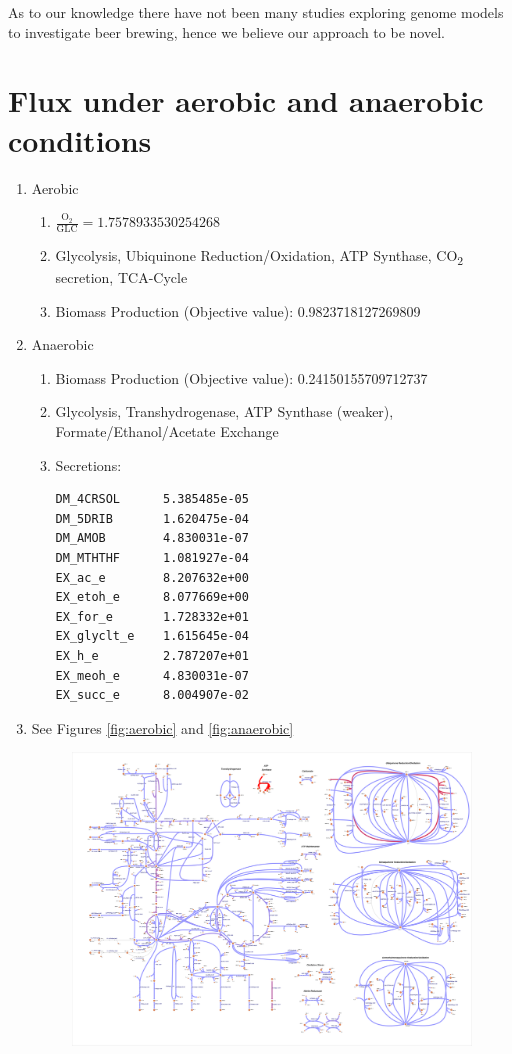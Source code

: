 \documentclass{scrartcl}
\begin{document}
As to our knowledge there have not been many studies exploring genome models to investigate beer brewing, hence we believe our approach to be novel.

\printbibliography
\section{Flux under aerobic and anaerobic conditions}
\begin{enumerate}
\item Aerobic
\begin{enumerate}
\item $\mathrm{\frac{O_2}{GLC}} = 1.7578933530254268$
\item Glycolysis, Ubiquinone Reduction/Oxidation, ATP Synthase, CO\textsubscript{2} secretion, TCA-Cycle
\item Biomass Production (Objective value): 0.9823718127269809
\end{enumerate}
\item Anaerobic
\begin{enumerate}
\item Biomass Production (Objective value): 0.24150155709712737
\item Glycolysis, Transhydrogenase, ATP Synthase (weaker), Formate/Ethanol/Acetate Exchange
\item Secretions: 
\begin{lstlisting}
DM_4CRSOL      5.385485e-05
DM_5DRIB       1.620475e-04
DM_AMOB        4.830031e-07
DM_MTHTHF      1.081927e-04
EX_ac_e        8.207632e+00
EX_etoh_e      8.077669e+00
EX_for_e       1.728332e+01
EX_glyclt_e    1.615645e-04
EX_h_e         2.787207e+01
EX_meoh_e      4.830031e-07
EX_succ_e      8.004907e-02
\end{lstlisting}
\end{enumerate}
\item See Figures \ref{fig:aerobic} and \ref{fig:anaerobic}
\begin{figure}[H]
	\centering
	\includegraphics[max width=\linewidth]{src/2_a.pdf}

\end{figure}
\end{enumerate}
\end{document}
